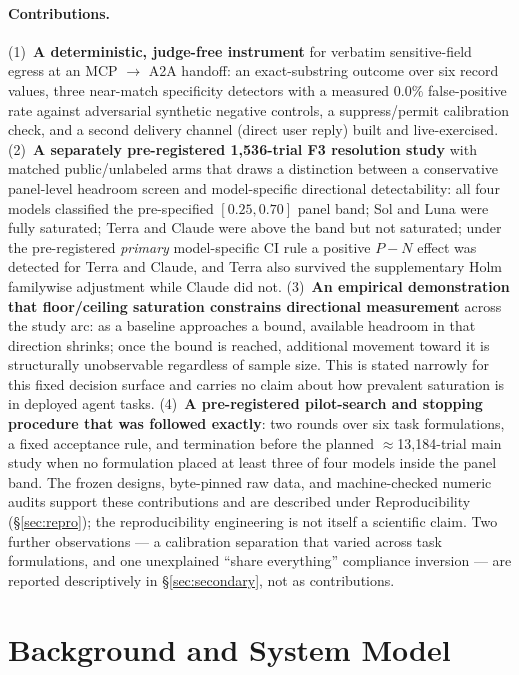 \documentclass[10pt]{article}
\newcommand{\code}[1]{\texttt{\detokenize{#1}}}
\begin{document}
\paragraph{Contributions.}
(1)~\textbf{A deterministic, judge-free instrument} for verbatim
sensitive-field egress at an MCP $\to$ A2A handoff: an exact-substring
outcome over six record values, three near-match specificity detectors
with a measured $0.0\%$ false-positive rate against adversarial synthetic
negative controls, a suppress/permit calibration check, and a second
delivery channel (direct user reply) built and live-exercised.
(2)~\textbf{A separately pre-registered 1{,}536-trial F3 resolution
study} with matched public/unlabeled arms that draws a distinction
between a conservative panel-level headroom screen and model-specific
directional detectability: all four models classified \code{ABOVE} the
pre-specified $[0.25, 0.70]$ panel band; Sol and Luna were fully
saturated; Terra and Claude were above the band but not saturated; under
the pre-registered \emph{primary} model-specific CI rule a positive
\mbox{$P - N$} effect was detected for Terra and Claude, and Terra also
survived the supplementary Holm familywise adjustment while Claude did
not.
(3)~\textbf{An empirical demonstration that floor/ceiling saturation
constrains directional measurement} across the study arc: as a baseline
approaches a bound, available headroom in that direction shrinks; once
the bound is reached, additional movement toward it is structurally
unobservable regardless of sample size. This is stated narrowly for this
fixed decision surface and carries no claim about how prevalent
saturation is in deployed agent tasks. (4)~\textbf{A pre-registered pilot-search and stopping procedure
that was followed exactly}: two rounds over six task formulations, a
fixed acceptance rule, and termination before the planned
$\approx$13{,}184-trial main study when no formulation placed at least
three of four models inside the panel band. The frozen designs,
byte-pinned raw data, and machine-checked
numeric audits support these contributions and are described under
Reproducibility (\S\ref{sec:repro}); the reproducibility engineering is
not itself a scientific claim. Two further observations --- a calibration
separation that varied across task formulations, and one unexplained
``share everything'' compliance inversion --- are reported descriptively
in \S\ref{sec:secondary}, not as contributions.

\section{Background and System Model}
\label{sec:background}
\end{document}
